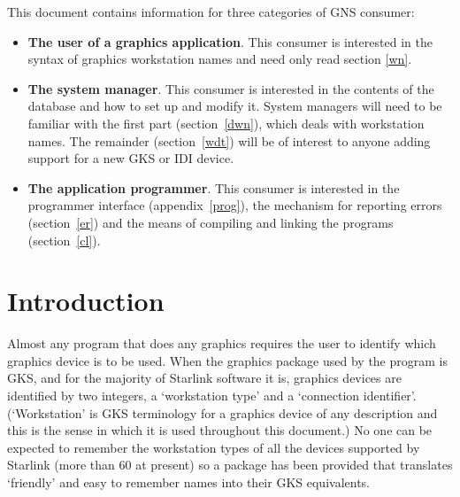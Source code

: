 \vspace{25mm}

This document contains information for three categories of GNS consumer:

\begin{itemize}

\item {\bf The user of a graphics application}. This consumer is interested in
the syntax of graphics workstation names and need only read section \ref{wn}.

\item {\bf The system manager}. This consumer is interested in the contents
of the database and how to set up and modify it. System managers will need to
be familiar with the first part (section~\ref{dwn}), which deals with
workstation names. The remainder (section~\ref{wdt}) will be of interest to
anyone adding support for a new GKS or IDI device.

\item {\bf The application programmer}. This consumer is interested in the
programmer interface (appendix~\ref{prog}), the mechanism for reporting
errors (section~\ref{er}) and the means of compiling and linking the
programs (section~\ref{cl}).

\end{itemize}

\newpage

\setlength{\parskip}{0mm}
\tableofcontents
\setlength{\parskip}{\medskipamount}
\markright{\stardocname}

\newpage

\section{Introduction}\label{in}

Almost any program that does any graphics requires the user to identify which
graphics device is to be used. When the graphics package used by the program is
GKS, and for the majority of Starlink software it is, graphics devices are
identified by two integers, a `workstation type' and a `connection
identifier'. (`Workstation' is GKS terminology for a graphics device of any
description and this is the sense in which it is used throughout this
document.) No one can be expected to remember the workstation types of all the
devices supported by Starlink (more than 60 at present) so a package has been
provided that translates `friendly' and easy to remember names into their GKS
equivalents.

